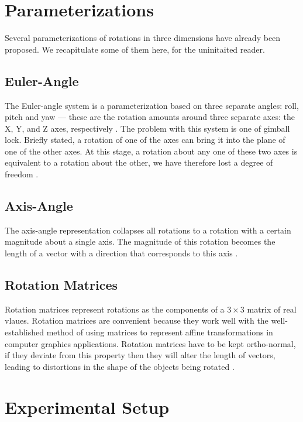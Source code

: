 \documentclass{acm_proc_article-sp}
\begin{document}
\section{Parameterizations}

Several parameterizations of rotations in three dimensions have already been proposed.
We recapitulate some of them here, for the uninitaited reader.

\subsection{Euler-Angle}

The Euler-angle system is a parameterization based on three separate angles: roll, pitch and yaw --- these are the rotation amounts around three separate axes: the X, Y, and Z axes, respectively \parencite[11]{diebel06}.
The problem with this system is one of gimball lock.
Briefly stated, a rotation of one of the axes can bring it into the plane of one of the other axes.
At this stage, a rotation about any one of these two axes is equivalent to a rotation about the other, we have therefore lost a degree of freedom \parencite[4]{pletinckx89}.

\subsection{Axis-Angle}

The axis-angle representation collapses all rotations to a rotation with a certain magnitude about a single axis.
The magnitude of this rotation becomes the length of a vector with a direction that corresponds to this axis \parencite[18]{diebel06}.

\subsection{Rotation Matrices}

Rotation matrices represent rotations as the components of a $3 \times 3$ matrix of real vlaues.
Rotation matrices are convenient because they work well with the well-established method of using matrices to represent affine transformations in computer graphics applications.
Rotation matrices have to be kept ortho-normal, if they deviate from this property then they will alter the length of vectors, leading to distortions in the shape of the objects being rotated \parencite[4--5]{diebel06}.

\section{Experimental Setup}
\end{document}
